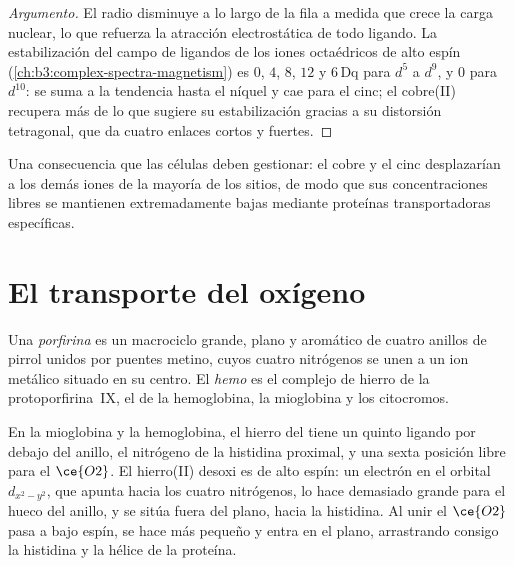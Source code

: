 \begin{proof}[Argumento]
El radio disminuye a lo largo de la fila a medida que crece la carga nuclear, lo que refuerza
la atracción electrostática de todo ligando. La estabilización del campo de ligandos de los
iones octaédricos de alto espín (\cref{ch:b3:complex-spectra-magnetism}) es $0$, $4$,
$8$, $12$ y $6\,\mathrm{Dq}$ para $d^5$ a $d^9$, y $0$ para $d^{10}$: se suma a la tendencia hasta el níquel y
cae para el cinc; el cobre(II) recupera más de lo que sugiere su estabilización gracias a
su distorsión tetragonal, que da cuatro enlaces cortos y fuertes.
\end{proof}

Una consecuencia que las células deben gestionar: el cobre y el cinc desplazarían a los
demás iones de la mayoría de los sitios, de modo que sus concentraciones libres se mantienen extremadamente bajas
mediante proteínas transportadoras específicas.

\section{El transporte del oxígeno}

\begin{definition}\label{def:b3:bioinorganic:haem}
Una \emph{porfirina} es un macrociclo grande, plano y aromático de cuatro
anillos de pirrol unidos por puentes metino, cuyos cuatro nitrógenos se unen a un ion metálico
situado en su centro. El \emph{hemo} es el complejo de hierro de la protoporfirina~IX,
el  de la hemoglobina, la mioglobina y los citocromos.
\end{definition}

En la mioglobina y la hemoglobina, el hierro del  tiene un quinto ligando por debajo del
anillo, el nitrógeno de la histidina proximal, y una sexta posición libre para el $\ce{O2}$.
El hierro(II) desoxi es de alto espín: un electrón en el orbital $d_{x^2-y^2}$, que apunta hacia los cuatro
nitrógenos, lo hace demasiado grande para el hueco del anillo, y se sitúa fuera del
plano, hacia la histidina. Al unir el $\ce{O2}$ pasa a bajo espín, se hace más pequeño y
entra en el plano, arrastrando consigo la histidina y la hélice de la proteína.

